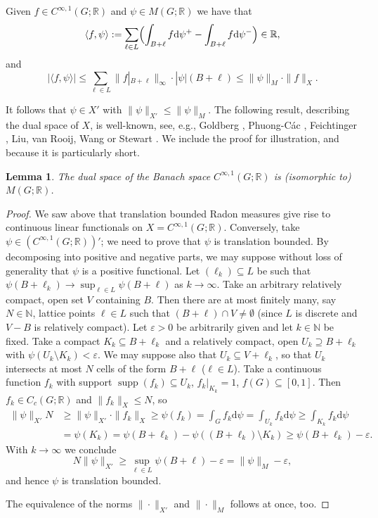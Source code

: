 \documentclass[[a4paper,english,12pt]{amsart}
\theoremstyle{plain}
\newtheorem{lemma}[theorem]{Lemma}
\theoremstyle{remark}
\newcommand\supp{\operatorname{supp}}
\newcommand{\RR}{\mathbb R}
\newcommand{\NN}{\mathbb N}
\def\veps{\varepsilon}
\def\dd{\mathrm{d}}
\begin{document}
Given $f\in C^{\infty,1}(G;\RR)$ and $\psi\in M(G;\RR)$ we have that
\[
\langle f,\psi\rangle:= \sum_{\ell \in L}\Bigl( \int_{B+\ell} f \dd\psi^+-\int_{B+\ell} f \dd\psi^-\Bigr)\in \RR,
\]
and
\[
|\langle f,\psi\rangle|\leq\sum_{\ell\in L}\|f|_{B+\ell}\|_\infty \cdot |\psi|(B+\ell)\leq \|\psi\|_{M}\cdot \|f\|_{X}.
\]


It follows that $\psi\in X'$ with $\|\psi\|_{X'}\leq \|\psi\|_{M}$.
The following result, describing the dual space of $X$,  is well-known, see, e.g., Goldberg \cite{Goldberg1967}, Phuong-C\'ac \cite{Cac}, Feichtinger \cite{Feichtinger1977}, Liu, van Rooij, Wang \cite{lrj} or Stewart \cite{Stewart1979}. We include the proof for illustration, and because it is particularly short.
\begin{lemma}\label{l:Dual-of-X} The dual space of the Banach space $C^{\infty,1}(G;\RR)$ is (isomorphic to) $M(G;\RR)$.
\end{lemma}
\begin{proof} We saw above that translation bounded Radon measures give rise to continuous linear functionals on $X=C^{\infty,1}(G;\RR)$. Conversely, take $\psi\in (C^{\infty,1}(G;\RR))'$; we need to prove that $\psi$ is translation bounded. By decomposing into positive and negative parts, we may suppose without loss of generality that $\psi$ is a positive functional. Let $(\ell_k)\subseteq L$ be such that $\psi(B+\ell_k)\to \sup_{\ell \in L} \psi(B+\ell)$ as $k\to\infty$. Take an arbitrary relatively compact, open set $V$ containing $B$. Then there are at most finitely many, say $N\in \NN$, lattice points $\ell\in L$ such that $(B+\ell) \cap V\neq \emptyset$ (since $L$ is discrete and $V-B$ is relatively compact). Let $\veps>0$ be arbitrarily given and let $k\in \NN$ be fixed. Take a compact $K_k\subseteq B+\ell_k$ and  a relatively compact, open $U_k\supseteq B+\ell_k$ with  $\psi(U_k\setminus K_k)<\veps$.
We may suppose also that $U_k\subseteq V+\ell_k$, so that $U_k$ intersects at most $N$ cells of the form $B+\ell$ ($\ell\in L$).  Take a continuous function $f_k$ with support $\supp ( f_k)\subseteq U_k$, $f_k|_{K_k}=1$, $f(G)\subseteq [0,1]$. Then $f_k\in C_c(G;\RR)$ and $\|f_k\|_X\leq N$, so
	\begin{align*}
	\|\psi\|_{X'}N&\geq \|\psi\|_{X'}\cdot\|f_k\|_X\geq \psi(f_k)=\int_G f_k\dd\psi
	=\int_{U_k} f_k\dd\psi
	\geq \int_{K_k} f_k\dd\psi\\
	&=\psi(K_k)=\psi(B+\ell_k)-\psi((B+\ell_k)\setminus K_k)\geq \psi(B+\ell_k)-\veps.
	\end{align*}
With $k\to \infty$ we conclude
	\[
	N\|\psi\|_{X'}\geq \sup_{\ell \in L} \psi(B+\ell)-\veps = \| \psi \|_M - \veps,
	\]
	and hence $\psi$ is translation bounded.	

The equivalence of the norms $\|\cdot\|_{X'}$ and $\|\cdot\|_M$ follows at once, too.
\end{proof}
\end{document}
